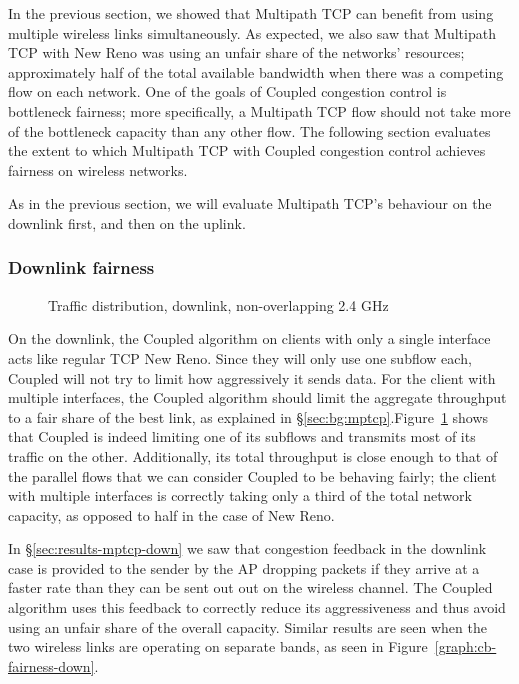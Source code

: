 In the previous section, we showed that Multipath TCP can benefit from
using multiple wireless links simultaneously. As expected, we also saw that
Multipath TCP with New Reno was using an unfair share of the networks'
resources; approximately half of the total available bandwidth when there was a
competing flow on each network. One of the goals of Coupled congestion 
control is bottleneck fairness; more specifically, a 
Multipath TCP flow should not take more of the bottleneck capacity than any 
other flow. The following section evaluates the extent to which Multipath TCP with 
Coupled congestion control achieves fairness on wireless networks.

As in the previous section, we will evaluate Multipath TCP's behaviour on the
downlink first, and then on the uplink.

\subsubsection{Downlink fairness}

\begin{figure}[h]
 \centering
 
 \caption{Traffic distribution, downlink, non-overlapping 2.4 GHz}\label{graph:down-fair}
\end{figure}

On the downlink, the Coupled algorithm on clients with only a single
interface acts like regular TCP New Reno. Since they will only use one subflow
each, Coupled will not try to limit how aggressively it sends data. For the
client with multiple interfaces, the Coupled algorithm should limit the
aggregate throughput to a fair share of the best link, as explained in
\S\ref{sec:bg:mptcp}.\@ Figure~\ref{graph:down-fair} shows that Coupled is
indeed limiting one of its subflows and transmits most of its traffic on the
other. Additionally, its total throughput is close enough to that of the
parallel flows that we can consider Coupled to be behaving fairly; the client
with multiple interfaces is correctly taking only a third of the total network
capacity, as opposed to half in the case of New Reno.


In \S\ref{sec:results-mptcp-down} we saw that congestion feedback in the 
downlink case is provided to the sender by the AP dropping packets if they
arrive at a faster rate than they can be sent out out on the wireless channel. The
Coupled algorithm uses this feedback to correctly reduce its aggressiveness and 
thus avoid using an unfair share of the overall capacity.
Similar results are seen when the two wireless links are operating on separate
bands, as seen in Figure~\ref{graph:cb-fairness-down}.


